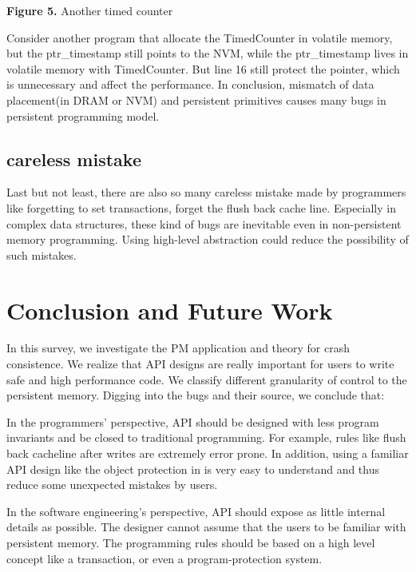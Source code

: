 \documentclass{sig-alternate}
\begin{document}
\textbf{Figure 5.} Another timed counter

Consider another program that allocate the TimedCounter in volatile memory, but the ptr\_timestamp still points to the NVM, while the ptr\_timestamp lives in volatile memory with TimedCounter. But line 16 still protect the pointer, which is unnecessary and affect the performance. In conclusion, mismatch of data placement(in DRAM or NVM) and persistent primitives causes many bugs in persistent programming model.



\subsection{careless mistake}
Last but not least, there are also so many careless mistake made by programmers like forgetting to set transactions, forget the flush back cache line. Especially in complex data structures, these kind of bugs are inevitable even in non-persistent memory programming. Using high-level abstraction could reduce the possibility of such mistakes. 







\section{Conclusion and Future Work}

In this survey, we investigate the PM application and theory for crash consistence. We realize that API designs are really important for users to write safe and high performance code. We classify different granularity of control to the persistent memory. Digging into the bugs and their source, we conclude that:

In the programmers' perspective, API should be designed with less program invariants and be closed to traditional programming. For example, rules like flush back cacheline after writes are extremely error prone. In addition, using a familiar API design like the object protection in \cite{Wu:2018:EBJ:3173162.3173201} is very easy to understand and thus reduce some unexpected mistakes by users.
 
In the software engineering's perspective, API should expose as little internal details as possible. The designer cannot assume that the users to be familiar with persistent memory. The programming rules should be based on a high level concept like a transaction, or even a program-protection system.
\end{document}
